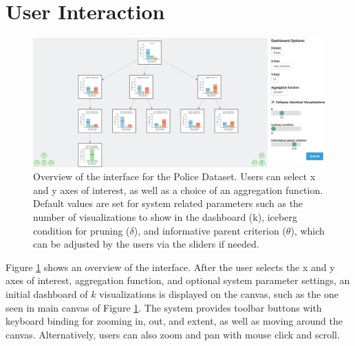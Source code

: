 \section{User Interaction\label{sec:interaction}}
\begin{figure}[ht!]
\centering
\includegraphics[width=\linewidth]{figures/overview.jpeg}
\caption{Overview of the \system interface for the Police Dataset. Users can select x and y axes of interest, as well as a choice of an aggregation function. Default values are set for system related parameters such as the number of visualizations to show in the dashboard (k), iceberg condition for pruning ($\delta$), and informative parent criterion ($\theta$), which can be adjusted by the users via the sliders if needed.}
\label{fig:overview}
\end{figure}
\par Figure \ref{fig:overview} shows an overview of the \system interface. After the user selects the x and y axes of interest, aggregation function, and optional system parameter settings, an initial dashboard of $k$ visualizations is displayed on the canvas, such as the one seen in main canvas of Figure \ref{fig:overview}.  The system provides toolbar buttons with keyboard binding for zooming in, out, and extent, as well as moving around the canvas. Alternatively, users can also zoom and pan with mouse click and scroll.


